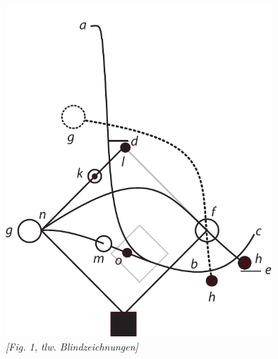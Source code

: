 \pend \newpage
  \begin{center}
   \includegraphics[width=0.75\textwidth]{images/38_202v}\\
   \vspace{0.5ex}
   \textit{[Fig. 1, tlw. Blindzeichnungen]}
   \vspace{1.0ex}
   \end{center} 